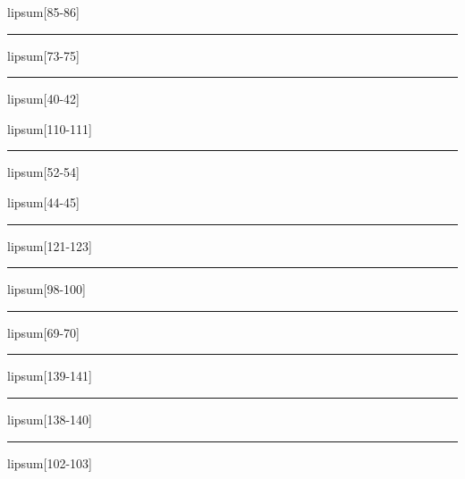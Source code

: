\documentclass[11pt,a4paper]{article}
\begin{document}
lipsum[85-86]

\begin{simplewrap}
  \textcolor{yellow!22}{\rule{4.2cm}{6.4cm}}
\end{simplewrap}
lipsum[73-75]

\begin{simplewrap}
  \textcolor{orange!13}{\rule{4.2cm}{6.4cm}}
\end{simplewrap}
lipsum[40-42]

lipsum[110-111]

\begin{simplewrap}
  \textcolor{green!28}{\rule{5.5cm}{7.0cm}}
\end{simplewrap}
lipsum[52-54]

lipsum[44-45]

\begin{simplewrap}
  \textcolor{violet!15}{\rule{4.4cm}{2.9cm}}
\end{simplewrap}
lipsum[121-123]

\begin{simplewrap}
  \textcolor{teal!15}{\rule{4.9cm}{5.1cm}}
\end{simplewrap}
lipsum[98-100]

\begin{simplewrap}
  \textcolor{blue!12}{\rule{3.8cm}{5.7cm}}
\end{simplewrap}
lipsum[69-70]

\begin{simplewrap}
  \textcolor{purple!58}{\rule{5.1cm}{2.8cm}}
\end{simplewrap}
lipsum[139-141]

\begin{simplewrap}
  \textcolor{magenta!45}{\rule{3.2cm}{5.1cm}}
\end{simplewrap}
lipsum[138-140]

\begin{simplewrap}
  \textcolor{red!46}{\rule{5.6cm}{5.8cm}}
\end{simplewrap}
lipsum[102-103]
\end{document}
